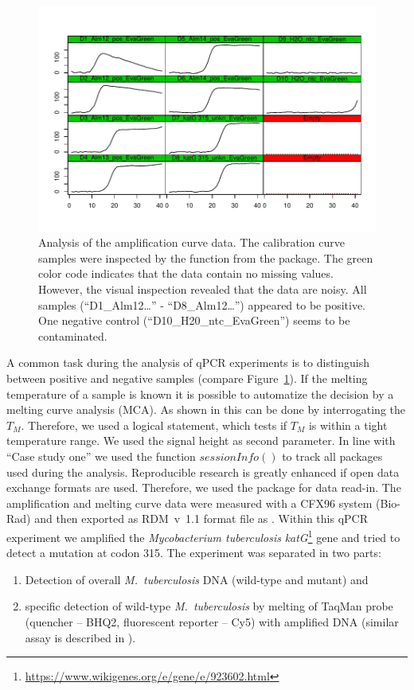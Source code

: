 \begin{figure}[htbp]
  \centering
  \includegraphics[clip=true, width=14cm]{figures/plotCurves.pdf}
  \caption{Analysis of the amplification curve data. The calibration curve 
samples were inspected by the  function from the 
 package. The green color code indicates that the data contain 
no missing values. However, the visual inspection revealed that the data are 
noisy. All samples (``D1\_Alm12\ldots'' - ``D8\_Alm12\ldots'') appeared to be 
positive. One negative control (``D10\_H20\_ntc\_EvaGreen'') seems to be 
contaminated.}
  \label{figure:plotCurves}
\end{figure}


A common task during the analysis of qPCR experiments is to distinguish between 
positive and negative samples (compare Figure~\ref{figure:plotCurves}). If the 
melting temperature of a sample is known it is possible to automatize the 
decision by a melting curve analysis (MCA). As shown in \citet{roediger_RJ_2013} 
this can be done by interrogating the $T_{M}$. Therefore, we used a logical 
statement, which tests if $T_{M}$ is within a tight temperature range. We used 
the signal height as second parameter. In line with ``Case study one'' we used 
the function $sessionInfo()$ to track all packages used during the analysis. 
Reproducible research is greatly enhanced if open data exchange formats are 
used. Therefore, we used the  package for data read-in. The 
amplification and melting curve data were measured with a CFX96 system (Bio-Rad) 
and then exported as RDM~v~1.1 format file as . 
Within this qPCR experiment we amplified the \textit{Mycobacterium tuberculosis} 
\textit{katG}\footnote{\url{https://www.wikigenes.org/e/gene/e/923602.html}} 
gene and tried to detect a mutation at codon 315. The experiment was separated 
in two parts: 
\begin{enumerate}
 \item Detection of overall \textit{M.~tuberculosis} DNA (wild-type 
and mutant) and
 \item specific detection of wild-type \textit{M.~tuberculosis} by melting of 
TaqMan probe (quencher -- BHQ2, fluorescent reporter -- Cy5) with amplified DNA 
(similar assay is described in \citet{luo_multiplex_2011}).
\end{enumerate}


